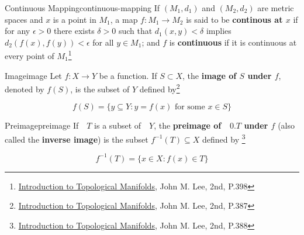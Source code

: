 \begin{Definition}{Continuous Mapping}{continuous-mapping}
    If $(M_1, d_1)$ and $(M_2, d_2)$ are metric spaces and $x$ is a point in $M_1$, a map $f: M_1 \rightarrow M_2$ is
    said to be \textbf{continous at $x$} if for any $\epsilon > 0$ there exists $\delta > 0$ such that
    $d_1(x, y) < \delta$ implies $d_2(f(x), f(y)) < \epsilon$ for all $y \in M_1$; and $f$ is \textbf{continuous} if it
    is continuous at every point of $M_1$\footnote{\href{https://trello.com/c/SI33o8fG}{Introduction to Topological Manifolds}, John M. Lee, 2nd, P.398}
\end{Definition}

\begin{Definition}{Image}{image}
    Let $f: X \rightarrow Y$ be a function. If $S \subset X$, the \textbf{image of $S$ under $f$}, denoted by $f(S)$, is
    the subset of $Y$ defined by\footnote{\href{https://trello.com/c/SI33o8fG}{Introduction to Topological Manifolds}, John M. Lee, 2nd, P.387}

    \begin{equation}
        f(S) = \{ y \subseteq Y: y = f(x) \text{ for some } x \in S \}
    \end{equation}
\end{Definition}

\begin{Definition}{Preimage}{preimage}
    If $\text{ }T$ is a subset of $\text{ }Y$, the \textbf{preimage of $\text{ }0.
    T$ under $f$} (also called the \textbf{inverse image}) is the
    subset $f^{-1}(T) \subseteq X$ defined by \footnote{\href{https://trello.com/c/SI33o8fG}{Introduction to Topological Manifolds}, John M. Lee, 2nd, P.388}

    \begin{equation}
        f^{-1}(T) = \{ x \in X : f(x) \in T \}
    \end{equation}
\end{Definition}

